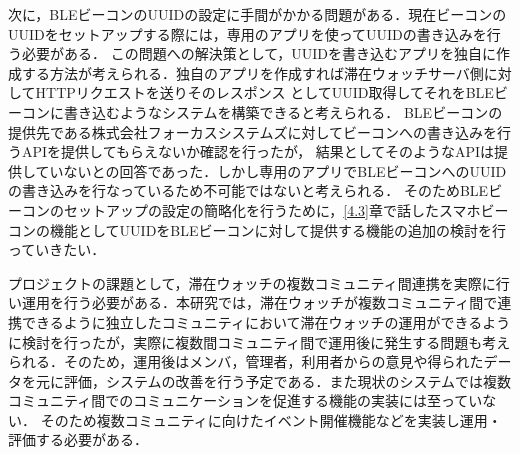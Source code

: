 次に，BLEビーコンのUUIDの設定に手間がかかる問題がある．現在ビーコンのUUIDをセットアップする際には，専用のアプリを使ってUUIDの書き込みを行う必要がある．
この問題への解決策として，UUIDを書き込むアプリを独自に作成する方法が考えられる．独自のアプリを作成すれば滞在ウォッチサーバ側に対してHTTPリクエストを送りそのレスポンス
としてUUID取得してそれをBLEビーコンに書き込むようなシステムを構築できると考えられる．
BLEビーコンの提供先である株式会社フォーカスシステムズに対してビーコンへの書き込みを行うAPIを提供してもらえないか確認を行ったが，
結果としてそのようなAPIは提供していないとの回答であった．しかし専用のアプリでBLEビーコンへのUUIDの書き込みを行なっているため不可能ではないと考えられる．
そのためBLEビーコンのセットアップの設定の簡略化を行うために，\ref{4.3}章で話したスマホビーコンの機能としてUUIDをBLEビーコンに対して提供する機能の追加の検討を行っていきたい．

プロジェクトの課題として，滞在ウォッチの複数コミュニティ間連携を実際に行い運用を行う必要がある．本研究では，滞在ウォッチが複数コミュニティ間で連携できるように独立したコミュニティにおいて滞在ウォッチの運用ができるように検討を行ったが，実際に複数間コミュニティ間で運用後に発生する問題も考えられる．そのため，運用後はメンバ，管理者，利用者からの意見や得られたデータを元に評価，システムの改善を行う予定である．また現状のシステムでは複数コミュニティ間でのコミュニケーションを促進する機能の実装には至っていない．
そのため複数コミュニティに向けたイベント開催機能などを実装し運用・評価する必要がある．



